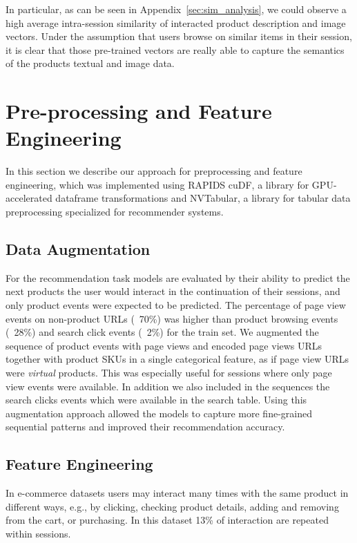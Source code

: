 \documentclass[sigconf,screen]{acmart}
\begin{document}
In particular, as can be seen in Appendix~\ref{sec:sim_analysis}, we could observe a high average intra-session similarity of interacted product description and image vectors. Under the assumption that users browse on similar items in their session, it is clear that those pre-trained vectors are really able to capture the semantics of the products textual and image data.

\section{Pre-processing and Feature Engineering}
\label{sec:preproc_feat_eng}

In this section we describe our approach for preprocessing and feature engineering, which was implemented using RAPIDS cuDF, a library for GPU-accelerated dataframe
transformations and NVTabular, a library for tabular data preprocessing specialized for recommender systems.

\vspace{-3.0mm}

\subsection{Data Augmentation}
For the recommendation task models are evaluated by their ability to predict the next products the user would interact in the continuation of their sessions, and only product events were expected to be predicted. The percentage of page view events on non-product URLs (~70\%) was higher than product browsing events (~28\%) and search click events (~2\%) for the train set. We augmented the sequence of product events with page views and encoded page views URLs together with product SKUs in a single categorical feature, as if page view URLs were \emph{virtual} products. This was especially useful for sessions where only page view events were available. In addition we also included in the sequences the search clicks events which were available in the search table.
Using this augmentation approach allowed the models to capture more fine-grained sequential patterns and improved their recommendation accuracy.


\subsection{Feature Engineering}
In e-commerce datasets users may interact many times with the same product in different ways, e.g., by clicking, checking product details, adding and removing from the cart, or purchasing. In this dataset 13\% of interaction are repeated within sessions.
\end{document}
